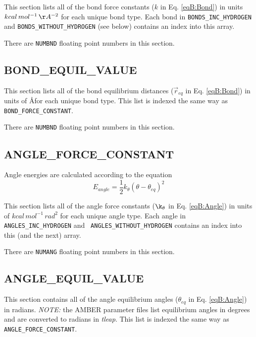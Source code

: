 This section lists all of the bond force constants ($k$ in Eq. \ref{eqB:Bond})
in units $kcal\, mol^{-1}\, \AA^{-2}$ for each unique bond type. Each bond in
{\tt BONDS\_INC\_HYDROGEN} and {\tt BONDS\_WITHOUT\_HYDROGEN} (see below)
contains an index into this array.


\noindent There are {\tt NUMBND} floating point numbers in this section.

\subsection*{BOND\_EQUIL\_VALUE}

This section lists all of the bond equilibrium distances ($\vec{r}_{eq}$ in Eq.
\ref{eqB:Bond}) in units of \AA for each unique bond type. This list is indexed
the same way as {\tt BOND\_FORCE\_CONSTANT}.


\noindent There are {\tt NUMBND} floating point numbers in this section.

\subsection*{ANGLE\_FORCE\_CONSTANT}

Angle energies are calculated according to the equation
\begin{equation}
   E_{angle} = \frac 1 2 k_{\theta} \left ( \theta - \theta _ {eq} \right ) ^ 2
   \label{eqB:Angle}
\end{equation}

This section lists all of the angle force constants ($\k_{\theta}$ in Eq.
\ref{eqB:Angle}) in units of $kcal\, mol^{-1}\, rad^2$ for each unique angle
type. Each angle in {\tt ANGLES\_INC\_HYDROGEN} and {\tt
ANGLES\_WITHOUT\_HYDROGEN} contains an index into this (and the next) array.


\noindent There are {\tt NUMANG} floating point numbers in this section.

\subsection*{ANGLE\_EQUIL\_VALUE}

This section contains all of the angle equilibrium angles ($\theta_{eq}$ in Eq.
\ref{eqB:Angle}) in radians.  \emph{NOTE:} the AMBER parameter files list
equilibrium angles in degrees and are converted to radians in \emph{tleap}. This
list is indexed the same way as {\tt ANGLE\_FORCE\_CONSTANT}.

